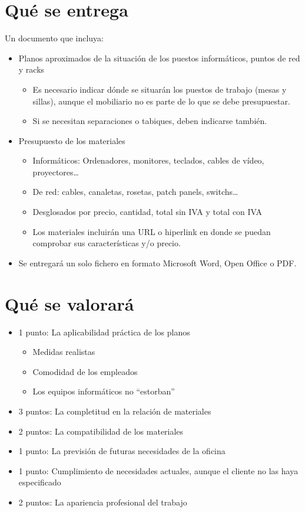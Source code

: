 \documentclass{article}
\begin{document}
\section{Qué se entrega}
\label{sec:org0000006}
Un documento que incluya:
\begin{itemize}
\item Planos aproximados de la situación de los puestos informáticos, puntos de red y racks
\begin{itemize}
\item Es necesario indicar dónde se situarán los puestos de trabajo (mesas y sillas), aunque el mobiliario no es
parte de lo que se debe presupuestar.
\item Si se necesitan separaciones o tabiques, deben indicarse también.
\end{itemize}
\item Presupuesto de los materiales
\begin{itemize}
\item Informáticos: Ordenadores, monitores, teclados, cables de vídeo, proyectores\ldots{}
\item De red: cables, canaletas, rosetas, patch panels, switchs…
\item Desglosados por precio, cantidad, total sin IVA y total con IVA
\item Los materiales incluirán una URL o hiperlink en donde se puedan comprobar sus características y/o precio.
\end{itemize}
\item Se entregará un solo fichero en formato Microsoft Word, Open Office o PDF.
\end{itemize}



\section{Qué se valorará}
\label{sec:org0000009}
\begin{itemize}
\item 1 punto: La aplicabilidad práctica de los planos
\begin{itemize}
\item Medidas realistas
\item Comodidad de los empleados
\item Los equipos informáticos no ``estorban''
\end{itemize}
\item 3 puntos: La completitud en la relación de materiales
\item 2 puntos: La compatibilidad de los materiales
\item 1 punto: La previsión de futuras necesidades de la oficina
\item 1 punto: Cumplimiento de necesidades actuales, aunque el cliente no las haya especificado
\item 2 puntos: La apariencia profesional del trabajo
\end{itemize}
\end{document}
